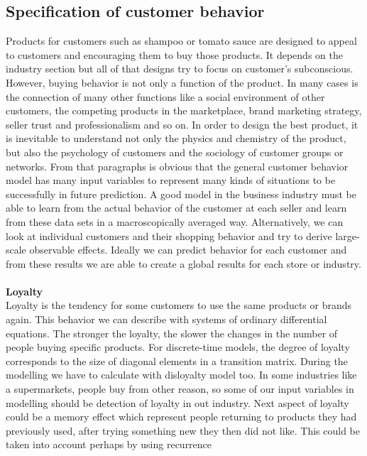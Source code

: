 \subsection{Specification of customer behavior} \label{subsec:specification}
Products for customers such as shampoo or tomato sauce are designed to appeal to customers and encouraging them to buy those products.
It depends on the industry section but all of that designs try to focus on customer’s subconscious.
However, buying behavior is not only a function of the product.
In many cases is the connection of many other functions like a social environment of other customers, the competing products in the marketplace,
brand marketing strategy, seller trust and professionalism and so on.
In order to design the best product, it is inevitable to understand not only the physics and chemistry of the product,
but also the psychology of customers and the sociology of customer groups or networks\cite{patel}.
From that paragraphs is obvious that the general customer behavior model has many input variables to represent many
kinds of situations to be successfully in future prediction.
A good model in the business industry must be able to learn from the actual behavior of the customer at each seller and learn from these data sets in a macroscopically averaged way.
Alternatively, we can look at individual customers and their shopping behavior and try to derive large-scale observable effects.
Ideally we can predict behavior for each customer and from these results we are able to create a global results for each store or industry.\\
\\
\textbf{Loyalty} \label{subsec:loyalty}\\
Loyalty is the tendency for some customers to use the same products or brands again. This behavior we can describe with systems of ordinary differential equations.
The stronger the loyalty, the slower the changes in the number of people buying specific products.
For discrete-time models, the degree of loyalty corresponds to the size of diagonal elements in a transition matrix.
During the modelling we have to calculate with  disloyalty model too. In some industries like a supermarkets,
people buy from other reason, so some of our input variables in modelling should be detection of loyalty in out industry.
Next aspect of loyalty could be a memory effect which represent people returning to products they had previously used,
after trying something new they then did not like. This could be taken into account perhaps by using recurrence
